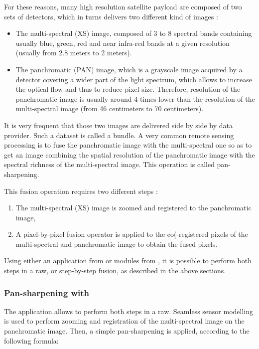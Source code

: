 For these reasons, many high resolution satellite payload are composed
of two sets of detectors, which in turns delivers two different kind
of images :

\begin{itemize}
\item The multi-spectral (XS) image, composed of 3 to 8 spectral bands
  containing usually blue, green, red and near infra-red bands at a
  given resolution (usually from 2.8 meters to 2 meters).
\item The panchromatic (PAN) image, which is a grayscale image acquired by a
  detector covering a wider part of the light spectrum, which allows
  to increase the optical flow and thus to reduce pixel
  size. Therefore, resolution of the panchromatic image is usually
  around 4 times lower than the resolution of the multi-spectral image
  (from 46 centimeters to 70 centimeters).
\end{itemize}

It is very frequent that those two images are delivered side by side
by data provider. Such a dataset is called a bundle. A very common
remote sensing processing is to fuse the panchromatic image with the
multi-spectral one so as to get an image combining the spatial
resolution of the panchromatic image with the spectral richness of the
multi-spectral image. This operation is called pan-sharpening.

This fusion operation requires two different steps :
\begin{enumerate}
\item The multi-spectral (XS) image is zoomed and registered to the
  panchromatic image,
\item A pixel-by-pixel fusion operator is applied to the co(-registered
  pixels of the multi-spectral and panchromatic image to obtain the
  fused pixels.
\end{enumerate}

Using either an application from \app or modules from \mont, it is
possible to perform both steps in a raw, or step-by-step fusion, as
described in the above sections.

\subsubsection{Pan-sharpening with \app}

The  application allows to
perform both steps in a raw. Seamless sensor modelling is used to
perform zooming and registration of the multi-spectral image on the
panchromatic image. Then, a simple pan-sharpening is applied,
according to the following formula:

